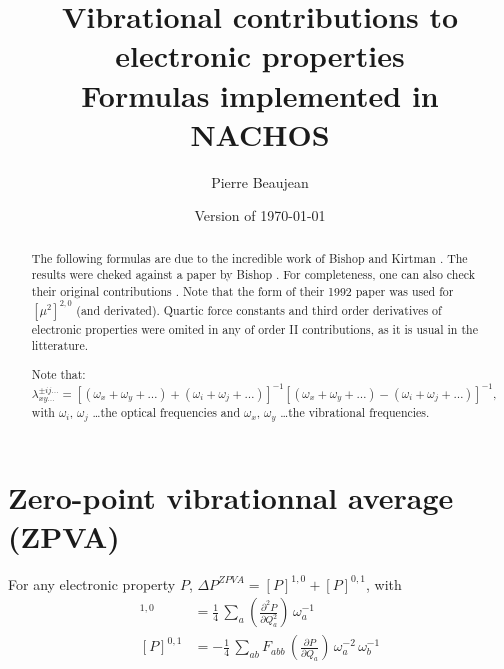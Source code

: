 \documentclass[12pt,a4paper]{article}
\title{Vibrational contributions to electronic properties \\ Formulas implemented in NACHOS}
\author{Pierre Beaujean}
\date{Version of \today}
\begin{document}
\maketitle

\allowdisplaybreaks

\begin{abstract}
The following formulas are due to the incredible work of Bishop and Kirtman \cite{bishop_additional_1998}. The results were cheked against a paper by Bishop \cite{bishop_static_1998}. For completeness, one can also check their original contributions \cite{kirtman_evaluation_1990,bishop_perturbation_1991,bishop_compact_1992}. Note that the form of their 1992 paper \cite{bishop_compact_1992} was used for $[\mu^2]^{2,0}$ (and derivated). Quartic force constants and third order derivatives of electronic properties were omited in any of order II contributions, as it is usual in the litterature.

Note that:
\begin{equation*}
\lambda^{\pm ij\ldots}_{xy\ldots}= [(\omega_x+\omega_y+\ldots) +(\omega_i+\omega_j+\ldots)]^{-1}
 [(\omega_x+\omega_y+\ldots)-(\omega_i+\omega_j+\ldots)]^{-1},
\end{equation*}
with $\omega_i$, $\omega_j$ \ldots the optical frequencies and $\omega_{x}$, $\omega_y$ \ldots the vibrational frequencies.
\end{abstract}

\newcommand{\tdiff}[2]{\left(\frac{\partial #1}{ \partial #2}\right)}
\newcommand{\lb}[2]{\lambda^{\pm #1}_{#2}}

\section{Zero-point vibrationnal average (ZPVA)}
For any electronic property $P$, $\Delta{P}^{ZPVA} = [P]^{1,0} + [P]^{0,1}$, with
\begin{align}
[P]^{1,0} &= \frac{1}{4}\,\sum_a \tdiff{^2P}{Q_a^2}\,\omega_a^{-1} \\
[P]^{0,1} &= -\frac{1}{4}\,\sum_{ab} F_{abb}\,\tdiff{P}{Q_a}\,\omega_a^{-2}\,\omega_b^{-1} 
\end{align}
\end{document}

